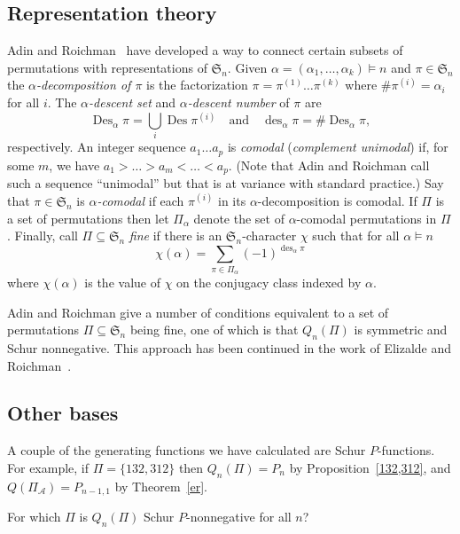 \documentclass[ALCO,ThmDefs,Unicode,epreuves]{cedram}
\newcommand{\comp}{\models}
\newcommand{\sbe}{\subseteq}
\newcommand{\al}{\alpha}
\newcommand{\cA}{{\mathcal A}}
\newcommand{\fS}{{\mathfrak S}}
\DeclareMathOperator{\des}{des}
\DeclareMathOperator{\Des}{Des}
\begin{document}

\subsection*{Representation theory}
Adin and Roichman~\cite{ar:mcd} have developed a way to connect certain subsets of permutations with representations of $\fS_n$.
Given $\al=(\al_1,\dots,\al_k)\comp n$ and $\pi\in\fS_n$ the \emph{$\al$-decomposition of $\pi$} is the factorization
$\pi = \pi^{(1)} \dots \pi^{(k)}$ where $\#\pi^{(i)}=\al_i$ for all $i$. The \emph{$\al$-descent set} and \emph{$\al$-descent number} of $\pi$ are
\[
\Des_\al \pi = \bigcup_i \Des \pi^{(i)} \quad \text{and} \quad \des_\al \pi = \#\Des_\al \pi,
\]
respectively. An integer sequence $a_1\dots a_p$ is \emph{comodal} (\emph{complement unimodal}) if, for some $m$, we have
$a_1>\dots > a_m < \dots < a_p$. (Note that Adin and Roichman call such a sequence ``unimodal'' but that is at variance with standard practice.)
Say that $\pi\in\fS_n$ is \emph{$\al$-comodal} if each $\pi^{(i)}$ in its $\al$-decomposition is comodal. If $\Pi$ is a set of permutations then let $\Pi_\al$ denote the set of $\al$-comodal permutations in $\Pi$. Finally, call $\Pi\sbe\fS_n$ \emph{fine} if there is an $\fS_n$-character $\chi$ such that for all $\al\comp n$
\[
\chi(\al) = \sum_{\pi\in\Pi_\al} (-1)^{\des_\al \pi}
\]
where $\chi(\al)$ is the value of $\chi$ on the conjugacy class indexed by $\al$. 

Adin and Roichman give a number of conditions equivalent to a set of permutations $\Pi\sbe\fS_n$ being fine, one of which is that $Q_n(\Pi)$ is symmetric and Schur nonnegative. 
This approach has been continued in the work of Elizalde and Roichman~\cite{er:rss}.


\subsection*{Other bases}
A couple of the generating functions we have calculated are Schur $P$-functions. For example, if $\Pi=\{132,312\}$ then $Q_n(\Pi)=P_n$ by Proposition~\ref{132,312}, and
$Q(\Pi_\cA)=P_{n-1,1}$ by Theorem~\ref{er}.
\begin{question}
For which $\Pi$ is $Q_n(\Pi)$ Schur $P$-nonnegative for all $n$?
\end{question}
\end{document}
